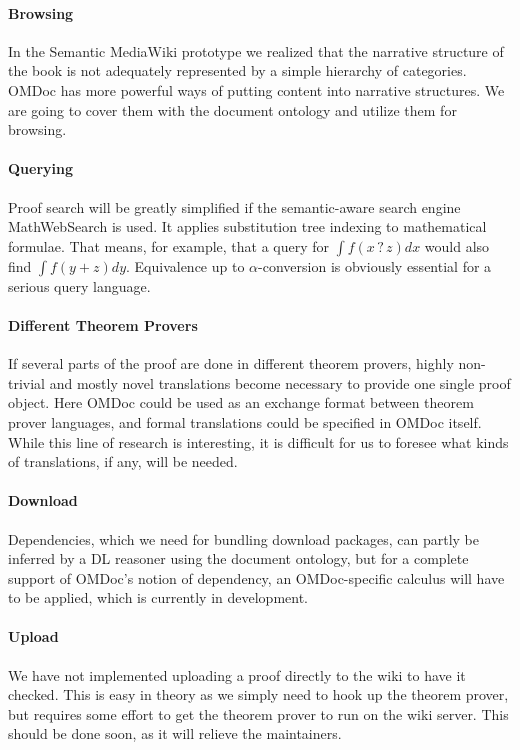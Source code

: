 \paragraph{Browsing} In the Semantic MediaWiki prototype we realized that the
narrative structure of the book is not adequately represented by a simple
hierarchy of categories.  OMDoc has more powerful ways of putting content into
narrative structures\cite{KohMueMue:dfncimk07}.  We are going to cover them with
the document ontology and utilize them for browsing.


\paragraph{Querying} Proof search will be greatly simplified if
the semantic-aware search engine MathWebSearch\cite{KohSuc:asemf06} is
used.  It applies substitution tree indexing to mathematical formulae.
That means, for example, that a query for $\int f(x\mathop{?}z) dx$
would also find $\int f(y+z) dy$.  Equivalence up to
$\alpha$-conversion is obviously essential for a serious query
language.

\paragraph{Different Theorem Provers} If several parts of the proof are done in different
theorem provers, highly non-trivial and mostly novel translations become
necessary to provide one single proof object. Here OMDoc could be used as an
exchange format between theorem prover languages, and formal translations could
be specified in OMDoc itself.  While this line of research is interesting, it is
difficult for us to foresee what kinds of translations, if any, will be needed.

\paragraph{Download}
Dependencies, which we need for bundling download packages, can partly be
inferred by a DL reasoner using the document ontology, but for a complete
support of OMDoc's notion of dependency, an OMDoc-specific calculus will have to
be applied, which is currently in development.

\paragraph{Upload} We have not implemented uploading a proof
directly to the wiki to have it checked.  This is easy in theory
as we simply need to hook up the theorem prover, but requires some
effort to get the theorem prover to run on the wiki server.  This
should be done soon, as it will relieve the maintainers.


